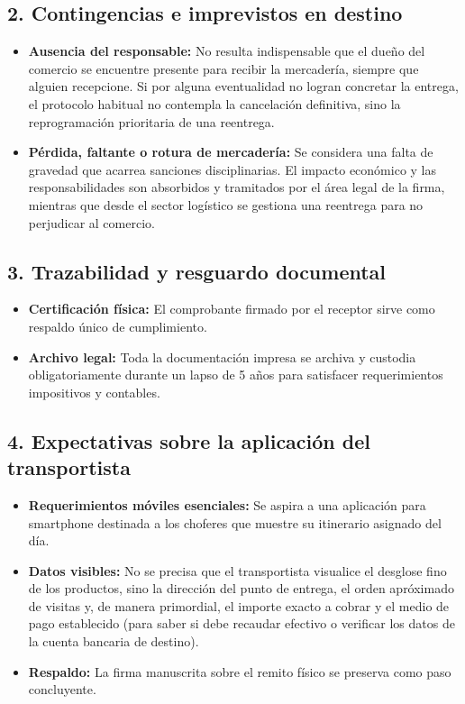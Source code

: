 \documentclass[11pt,a4paper]{article}
\begin{document}
\subsection*{2. Contingencias e imprevistos en destino}
\begin{itemize}
  \item \textbf{Ausencia del responsable:} No resulta indispensable que el dueño del comercio se encuentre presente para recibir la mercadería, siempre que alguien recepcione. Si por alguna eventualidad no logran concretar la entrega, el protocolo habitual no contempla la cancelación definitiva, sino la reprogramación prioritaria de una reentrega.
  \item \textbf{Pérdida, faltante o rotura de mercadería:} Se considera una falta de gravedad que acarrea sanciones disciplinarias. El impacto económico y las responsabilidades son absorbidos y tramitados por el área legal de la firma, mientras que desde el sector logístico se gestiona una reentrega para no perjudicar al comercio.
\end{itemize}

\subsection*{3. Trazabilidad y resguardo documental}
\begin{itemize}
  \item \textbf{Certificación física:} El comprobante firmado por el receptor sirve como respaldo único de cumplimiento.
  \item \textbf{Archivo legal:} Toda la documentación impresa se archiva y custodia obligatoriamente durante un lapso de 5 años para satisfacer requerimientos impositivos y contables.
\end{itemize}

\subsection*{4. Expectativas sobre la aplicación del transportista}
\begin{itemize}
  \item \textbf{Requerimientos móviles esenciales:} Se aspira a una aplicación para smartphone destinada a los choferes que muestre su itinerario asignado del día.
  \item \textbf{Datos visibles:} No se precisa que el transportista visualice el desglose fino de los productos, sino la dirección del punto de entrega, el orden apróximado de visitas y, de manera primordial, el importe exacto a cobrar y el medio de pago establecido (para saber si debe recaudar efectivo o verificar los datos de la cuenta bancaria de destino).
  \item \textbf{Respaldo:} La firma manuscrita sobre el remito físico se preserva como paso concluyente.
\end{itemize}
\end{document}
